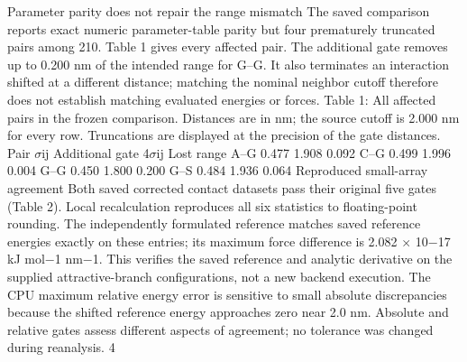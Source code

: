 \documentclass[11pt]{article}
\begin{document}
Parameter parity does not repair the range mismatch
The saved comparison reports exact numeric parameter-table parity but four prematurely truncated
pairs among 210. Table 1 gives every affected pair. The additional gate removes up to 0.200 nm
of the intended range for G–G. It also terminates an interaction shifted at a different distance;
matching the nominal neighbor cutoff therefore does not establish matching evaluated energies or
forces.
Table 1: All affected pairs in the frozen comparison. Distances are in nm; the source cutoff is 2.000
nm for every row. Truncations are displayed at the precision of the gate distances.
Pair \ensuremath{\sigma}ij Additional gate 4\ensuremath{\sigma}ij Lost range
A–G 0.477 1.908 0.092
C–G 0.499 1.996 0.004
G–G 0.450 1.800 0.200
G–S 0.484 1.936 0.064
Reproduced small-array agreement
Both saved corrected contact datasets pass their original five gates (Table 2). Local recalculation
reproduces all six statistics to floating-point rounding. The independently formulated reference
matches saved reference energies exactly on these entries; its maximum force difference is 2.082 \ensuremath{\times}
10\ensuremath{-}17 kJ mol\ensuremath{-}1 nm\ensuremath{-}1. This verifies the saved reference and analytic derivative on the supplied
attractive-branch configurations, not a new backend execution.
The CPU maximum relative energy error is sensitive to small absolute discrepancies because the
shifted reference energy approaches zero near 2.0 nm. Absolute and relative gates assess different
aspects of agreement; no tolerance was changed during reanalysis.
4
\end{document}
